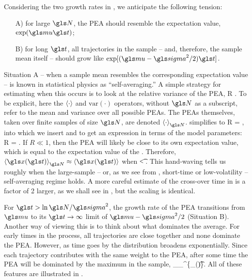 Considering the two growth rates in , we anticipate the following tension:
\begin{enumerate}
\item[A)] for large $\N$, the PEA should resemble the expectation value, $\exp(\gmu \t)$;
\item[B)] for long $\t$, all trajectories in the sample -- and, therefore, the sample mean itself -- should grow like $\exp[(\gmu-\gsigma^2/2)\t]$.
\end{enumerate}
Situation A -- when a sample mean resembles the corresponding expectation value -- is known in statistical physics as ``self-averaging.'' A simple strategy for estimating when this occurs is to look at the relative variance of the PEA,
\be
R \equiv {}.
\ee
To be explicit, here the $\left\langle\cdot \right\rangle$ and $\text{var}(\cdot)$ operators, 
without $\N$ as a subscript, 
refer to the mean and variance over all possible PEAs. The PEAs themselves, taken over finite samples of size $\N$, are denoted $\ave{\cdot}_\N$.  simplifies to
\be
R = ,
\ee
into which we insert  and  to get an expression in terms of the \GBM model parameters:
\be
R = .
\ee
If $R \ll 1$, then the PEA will likely be close to its own expectation value, which is equal to the expectation value of the \GBM. Therefore, $\ave{\x(\t)}_\N\approx\ave{\x(\t)}$ when
\be
\t < .
\ee
This hand-waving tells us roughly when the large-sample -- or, as we see from , short-time or low-volatility -- self-averaging regime holds. A more careful estimate of the cross-over time in  is a factor of 2 larger, as we shall see in , but the scaling is identical.

For $\t>\ln \N/\gsigma^2$, the growth rate of the PEA transitions from $\gmu$ to its $\t\to\infty$ limit of $\gmu-\gsigma^2/2$ (Situation B). 
Another way of viewing this is to think about what dominates the average. For early times in the process, all trajectories are close together and none dominate the PEA. However, as time goes by the distribution broadens exponentially. Since each trajectory contributes with the same weight to the PEA, after some time the PEA will be dominated by the maximum in the sample,
\be
\ave{\x(\t)}_\N \approx {}\max_{}^\N \{\x_\gi(\t)\}.
\ee
All of these features are illustrated in .

